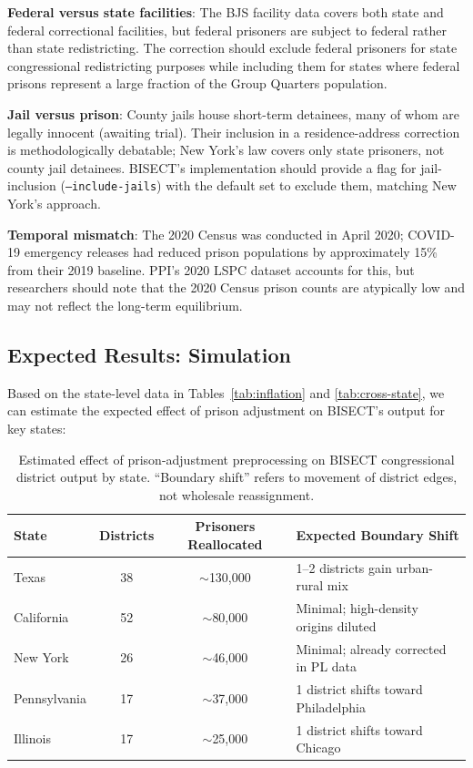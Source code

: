 \textbf{Federal versus state facilities}: The BJS facility data covers both state and federal correctional facilities, but federal prisoners are subject to federal rather than state redistricting. The correction should exclude federal prisoners for state congressional redistricting purposes while including them for states where federal prisons represent a large fraction of the Group Quarters population.

\textbf{Jail versus prison}: County jails house short-term detainees, many of whom are legally innocent (awaiting trial). Their inclusion in a residence-address correction is methodologically debatable; New York's law covers only state prisoners, not county jail detainees. BISECT's implementation should provide a flag for jail-inclusion (\texttt{--include-jails}) with the default set to exclude them, matching New York's approach.

\textbf{Temporal mismatch}: The 2020 Census was conducted in April 2020; COVID-19 emergency releases had reduced prison populations by approximately 15\% from their 2019 baseline. PPI's 2020 LSPC dataset accounts for this, but researchers should note that the 2020 Census prison counts are atypically low and may not reflect the long-term equilibrium.

\subsection{Expected Results: Simulation}

Based on the state-level data in Tables~\ref{tab:inflation} and \ref{tab:cross-state}, we can estimate the expected effect of prison adjustment on BISECT's output for key states:

\begin{table}[h]
\centering
\begin{tabular}{lccl}
\toprule
\textbf{State} & \textbf{Districts} & \textbf{Prisoners Reallocated} & \textbf{Expected Boundary Shift} \\
\midrule
Texas & 38 & $\sim$130,000 & 1--2 districts gain urban-rural mix \\
California & 52 & $\sim$80,000 & Minimal; high-density origins diluted \\
New York & 26 & $\sim$46,000 & Minimal; already corrected in PL data \\
Pennsylvania & 17 & $\sim$37,000 & 1 district shifts toward Philadelphia \\
Illinois & 17 & $\sim$25,000 & 1 district shifts toward Chicago \\
\bottomrule
\end{tabular}
\caption{Estimated effect of prison-adjustment preprocessing on BISECT congressional district output by state. ``Boundary shift'' refers to movement of district edges, not wholesale reassignment.}
\label{tab:expected}
\end{table}

